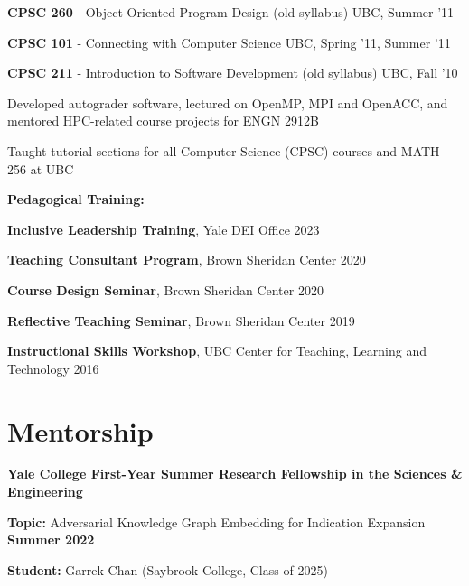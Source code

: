 \documentclass[margin,line]{res}
\newenvironment{list1}{
  \begin{list}{\ding{113}}{
      \setlength{\itemsep}{0in}
      \setlength{\parsep}{0in} \setlength{\parskip}{0in}
      \setlength{\topsep}{0in} \setlength{\partopsep}{0in}
      \setlength{\leftmargin}{0.17in}}}{\end{list}}
\newenvironment{list3}{
  \begin{list}{\textopenbullet}{
      \setlength{\itemsep}{0in}
      \setlength{\parsep}{0in} \setlength{\parskip}{0in}
      \setlength{\topsep}{0in} \setlength{\partopsep}{0in}
      \setlength{\leftmargin}{0.1in}}}{\end{list}}
\begin{document}
\begin{resume}
\begin{list1}
\setlength\itemsep{0.25em}
\item[] {\bf CPSC 260} - Object-Oriented Program Design (old syllabus) \hfill UBC, Summer '11
\item[] {\bf CPSC 101} - Connecting with Computer Science \hfill UBC, Spring '11, Summer '11
\item[] {\bf CPSC 211} - Introduction to Software Development (old syllabus) \hfill UBC, Fall '10\\
\begin{list3}
\vspace*{-.05cm}
\setlength\itemsep{0.25em}
\item Developed autograder software, lectured on OpenMP, MPI and OpenACC, and mentored HPC-related course projects for ENGN 2912B
\item Taught tutorial sections for all Computer Science (CPSC) courses and MATH 256 at UBC
\end{list3}
\end{list1}

\textbf{Pedagogical Training:}
\vspace*{.2cm}

\begin{list1}
\setlength\itemsep{0.25em}
\item[] {\bf Inclusive Leadership Training}, Yale DEI Office \hfill 2023
\item[] {\bf Teaching Consultant Program}, Brown Sheridan Center \hfill 2020
\item[] {\bf Course Design Seminar}, Brown Sheridan Center \hfill 2020
\item[] {\bf Reflective Teaching Seminar}, Brown Sheridan Center \hfill 2019
\item[] {\bf Instructional Skills Workshop}, UBC Center for Teaching, Learning and Technology \hfill 2016
\end{list1} 


\section{\sc Mentorship}

{\bf Yale College First-Year Summer Research Fellowship in the Sciences \& Engineering}
\vspace*{.3cm}
\begin{list1}
\setlength\itemsep{0.2em}
\item[] {\bf Topic:} Adversarial Knowledge Graph Embedding for Indication Expansion \hfill {\bf Summer 2022}
\item[] {\bf Student:} Garrek Chan (Saybrook College, Class of 2025) 
\end{list1}


\end{resume}
\end{document}
